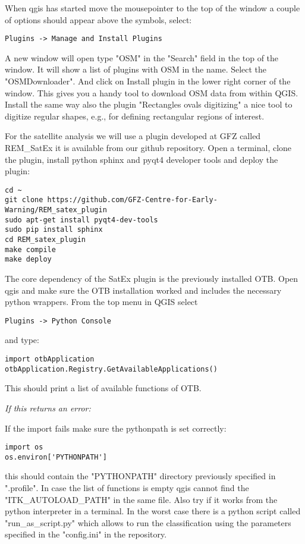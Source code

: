 \documentclass{article}
\begin{document}
When qgis has started move the mousepointer to the top of the window
a couple of options should appear above the symbols, select:
\begin{verbatim}
Plugins -> Manage and Install Plugins
\end{verbatim}
A new window will open type "OSM" in the "Search" field in the top 
of the window. It will show a list of plugins with OSM in the name.
Select the "OSMDownloader". And click on Install plugin 
in the lower right corner of the window. 
This gives you a handy tool to download
OSM data from within QGIS. Install the same way
also the plugin "Rectangles ovals digitizing" a nice tool to digitize
regular shapes, e.g., for defining rectangular regions of interest.

For the satellite analysis we will use a plugin developed at GFZ
called REM\_SatEx it is available from our github repository.
Open a terminal, clone the plugin, install python sphinx and
pyqt4 developer tools and deploy the plugin:
\begin{verbatim}
cd ~
git clone https://github.com/GFZ-Centre-for-Early-Warning/REM_satex_plugin
sudo apt-get install pyqt4-dev-tools
sudo pip install sphinx
cd REM_satex_plugin
make compile
make deploy
\end{verbatim}

The core dependency of the SatEx plugin is the previously installed 
OTB.
Open qgis and make sure the OTB installation worked 
and includes the necessary python wrappers. From
the top menu in QGIS select
\begin{verbatim}
Plugins -> Python Console
\end{verbatim}
and type:
\begin{verbatim}
import otbApplication
otbApplication.Registry.GetAvailableApplications()
\end{verbatim}
This should print a list of available functions of OTB. 

\textit{If this returns an error:}

If the import fails make sure the pythonpath is set correctly:
\begin{verbatim}
import os
os.environ['PYTHONPATH']
\end{verbatim}
this should contain the "PYTHONPATH" directory previously 
specified in ".profile".
In case the list of functions is empty qgis cannot find the
"ITK\_AUTOLOAD\_PATH" in the same file. Also try if
it works from the python interpreter in a terminal. 
In the worst case there is a python script called
"run\_as\_script.py" which allows to run the classification
using the parameters specified in the "config.ini" in the repository.
 
\end{document}
